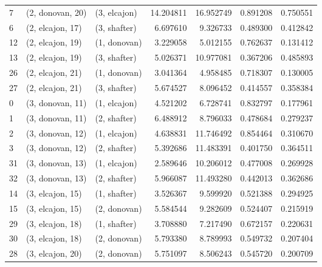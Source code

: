 \begin{tabular}{lllrrrr}
7  &  (2, donovan, 20) &     (3, elcajon) &  14.204811 &  16.952749 &   0.891208 &  0.750551 \\
6  &  (2, elcajon, 17) &     (3, shafter) &   6.697610 &   9.326733 &   0.489300 &  0.412842 \\
12 &  (2, elcajon, 19) &     (1, donovan) &   3.229058 &   5.012155 &   0.762637 &  0.131412 \\
13 &  (2, elcajon, 19) &     (3, shafter) &   5.026371 &  10.977081 &   0.367206 &  0.485893 \\
26 &  (2, elcajon, 21) &     (1, donovan) &   3.041364 &   4.958485 &   0.718307 &  0.130005 \\
27 &  (2, elcajon, 21) &     (3, shafter) &   5.674527 &   8.096452 &   0.414557 &  0.358384 \\
0  &  (3, donovan, 11) &     (1, elcajon) &   4.521202 &   6.728741 &   0.832797 &  0.177961 \\
1  &  (3, donovan, 11) &     (2, shafter) &   6.488912 &   8.796033 &   0.478684 &  0.279237 \\
2  &  (3, donovan, 12) &     (1, elcajon) &   4.638831 &  11.746492 &   0.854464 &  0.310670 \\
3  &  (3, donovan, 12) &     (2, shafter) &   5.392686 &  11.483391 &   0.401750 &  0.364511 \\
31 &  (3, donovan, 13) &     (1, elcajon) &   2.589646 &  10.206012 &   0.477008 &  0.269928 \\
32 &  (3, donovan, 13) &     (2, shafter) &   5.966087 &  11.493280 &   0.442013 &  0.362686 \\
14 &  (3, elcajon, 15) &     (1, shafter) &   3.526367 &   9.599920 &   0.521388 &  0.294925 \\
15 &  (3, elcajon, 15) &     (2, donovan) &   5.584544 &   9.282609 &   0.524407 &  0.215919 \\
29 &  (3, elcajon, 18) &     (1, shafter) &   3.708880 &   7.217490 &   0.672157 &  0.220631 \\
30 &  (3, elcajon, 18) &     (2, donovan) &   5.793380 &   8.789993 &   0.549732 &  0.207404 \\
28 &  (3, elcajon, 20) &     (2, donovan) &   5.751097 &   8.506243 &   0.545720 &  0.200709 \\
\bottomrule
\end{tabular}
